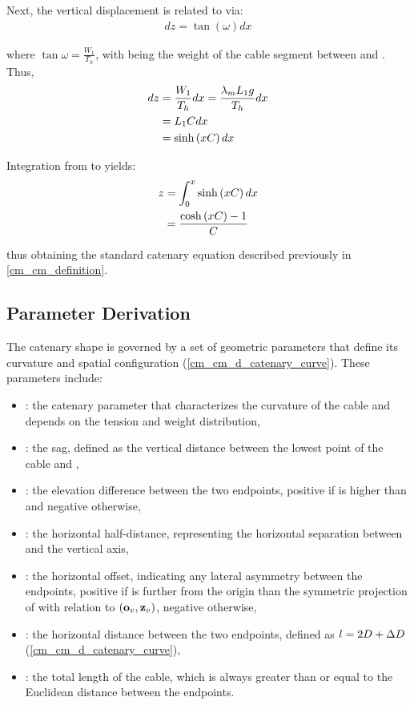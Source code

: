 Next, the vertical displacement  is related to  via:
\begin{align}
	dz = \tan{\left(\omega\right)} dx
\end{align}

where $\tan{\omega} = \frac{W_1}{T_h}$, with  being the weight of the cable segment
between  and . Thus,
\begin{align}
	dz & = \frac{W_1}{T_h} dx = \frac{\lambda_m L_1 g}{T_h} dx \\
	   & = L_1 C dx                                        \\
	   & = \sinh\left(x C\right) dx
\end{align}

Integration from  to  yields:
\begin{align}
	z & = \int_0^x \sinh\left(x C\right) dx       \\
	  & = \frac{\cosh\left(x C\right) - 1}{C}
\end{align}

thus obtaining the standard catenary equation described previously in \cref{cm_cm_definition}.

\subsection{Parameter Derivation}
\label{cm_cm_parameter_derivation}

The catenary shape is governed by a set of geometric parameters that define its curvature and
spatial configuration (\cref{cm_cm_d_catenary_curve}). These parameters include:
\begin{itemize}
	\item \catC: the catenary parameter that characterizes the curvature of the cable and depends on the tension and weight distribution,
	\item \catH: the sag, defined as the vertical distance between the lowest point of the cable and ,
	\item \catdH: the elevation difference between the two endpoints, positive if  is higher than  and negative otherwise,
	\item \catD: the horizontal half-distance, representing the horizontal separation between  and the vertical axis,
	\item \catdD: the horizontal offset, indicating any lateral asymmetry between the endpoints, positive if  is further from the origin than the symmetric projection of  with relation to $\left(\ldpoint{o}{v}, \ldvect{z}{v}\right)$, negative otherwise,
	\item \catl: the horizontal distance between the two endpoints, defined as $l = 2D+\Delta D$ (\cref{cm_cm_d_catenary_curve}),
	\item \catL: the total length of the cable, which is always greater than or equal to the Euclidean distance between the endpoints.
\end{itemize}

